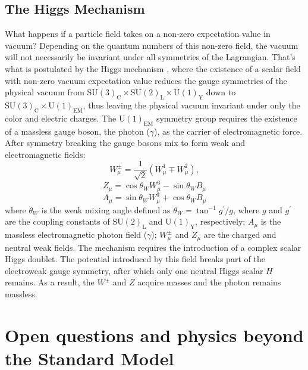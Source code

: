 \subsection{The Higgs Mechanism}

What happens if a particle field takes on a non-zero expectation value in vacuum? Depending on the
quantum numbers of this non-zero field, the vacuum will not necessarily be invariant under
all symmetries of the Lagrangian. That's what is postulated by the Higgs mechanism
\cite{Anderson:1963pc,Englert:1964et,Higgs:1964pj}, where
the existence of a scalar field with non-zero vacuum expectation value
reduces the gauge symmetries of the physical 
vacuum from $\text{SU}(3)_\text{C} \times \text{SU}(2)_\text{L} \times \text{U}(1)_\text{Y}$
down to $\text{SU}(3)_\text{C} \times \text{U}(1)_\text{EM}$, thus leaving the physical vacuum invariant under
only the color and electric charges. 
The $\text{U}(1)_\text{EM}$ symmetry group requires the existence of a massless
gauge boson, the photon ($\gamma$), as the carrier of electromagnetic force.
After symmetry breaking the gauge bosons mix to form weak and electromagnetic fields:
\begin{equation}
W_{\mu}^{\pm}=\frac{1}{\sqrt{2}}\left( W_{\mu}^1 \mp W_{\mu}^{2}\right),
\end{equation}
\begin{equation}
Z_{\mu}=\cos\theta_W W_{\mu}^3-\sin\theta_W B_{\mu}
\end{equation}
\begin{equation}
A_{\mu}=\sin\theta_W W_{\mu}^3+\cos\theta_W B_{\mu}
\end{equation}
where $\theta_W$ is the weak mixing angle defined as $\theta_W=\tan^{-1} g^{'}/g$, where $g$ 
and $g^{'}$ are the coupling constants of $\text{SU}(2)_\text{L}$ and $\text{U}(1)_\text{Y}$, respectively; $A_{\mu}$ is the 
massless electromagnetic photon field ($\gamma$); $W_{\mu}^{\pm}$ and $Z_{\mu}$ are the charged 
and neutral weak fields. The mechanism requires the introduction of a complex
scalar Higgs doublet. The potential introduced by this field breaks part of the electroweak
 gauge symmetry,
after which only one neutral Higgs scalar $H$ remains. As a result, 
the $W^{\pm}$ and $Z$ acquire masses and the photon remains massless.

\section{Open questions and physics beyond the Standard Model}

